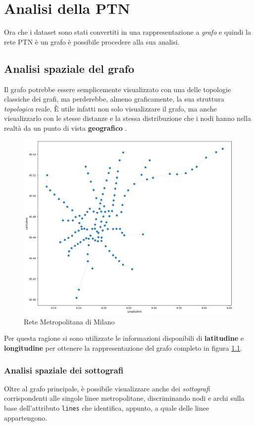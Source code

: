 \chapter{Analisi della PTN}
\label{cap3}
Ora che i dataset sono stati convertiti in una rappresentazione a \textit{grafo} e quindi la rete PTN è un grafo è possibile procedere alla sua analisi.

\section{Analisi spaziale del grafo}
Il grafo potrebbe essere semplicemente visualizzato con una delle topologie classiche dei grafi, ma perderebbe, almeno graficamente, la sua struttura \textit{topologica} reale. È utile infatti non solo visualizzare il grafo, ma anche visualizzarlo con le stesse distanze e la stessa distribuzione che i nodi hanno nella realtà da un punto di vista \textbf{geografico} \cite{Candelieri2019}.

\vspace{1em}
\begin{figure}[h!]
    \centering
    \includegraphics[width=0.8\linewidth]{Immagini//Capitoli//cap3/rete_atm.png}
    \caption{Rete Metropolitana di Milano}
    \label{fig:Rete Metropolitana di Milano}
\end{figure}
\vspace{1em}

Per questa ragione si sono utilizzate le informazioni disponibili di \textbf{latitudine} e \textbf{longitudine} per ottenere la rappresentazione del grafo completo in figura \ref{fig:Rete Metropolitana di Milano}.

\subsection{Analisi spaziale dei sottografi}
Oltre al grafo principale, è possibile visualizzare anche dei \textit{sottografi} corrispondenti alle singole linee metropolitane, discriminando nodi e archi sulla base dell'attributo \texttt{lines} che identifica, appunto, a quale delle linee appartengono.

